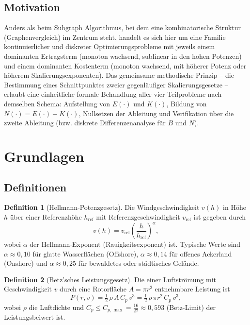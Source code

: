 ﻿\documentclass[a4paper,12pt]{article}
\theoremstyle{definition}
\newtheorem{definition}{Definition}
\begin{document}
\subsection{Motivation}

Anders als beim Subgraph Algorithmus, bei dem eine kombinatorische Struktur (Graphenvergleich) im Zentrum steht, handelt es sich hier um eine Familie kontinuierlicher und diskreter Optimierungsprobleme mit jeweils einem dominanten Ertragsterm (monoton wachsend, sublinear in den hohen Potenzen) und einem dominanten Kostenterm (monoton wachsend, mit höherer Potenz oder höherem Skalierungsexponenten). Das gemeinsame methodische Prinzip -- die Bestimmung eines Schnittpunktes zweier gegenläufiger Skalierungsgesetze -- erlaubt eine einheitliche formale Behandlung aller vier Teilprobleme nach demselben Schema: Aufstellung von $E(\cdot)$ und $K(\cdot)$, Bildung von $N(\cdot) = E(\cdot)-K(\cdot)$, Nullsetzen der Ableitung und Verifikation über die zweite Ableitung (bzw. diskrete Differenzenanalyse für $B$ und $N$).

\section{Grundlagen}

\subsection{Definitionen}

\begin{definition}[Hellmann-Potenzgesetz]
\label{def:hellmann}
Die Windgeschwindigkeit $v(h)$ in Höhe $h$ über einer Referenzhöhe $h_{\mathrm{ref}}$ mit Referenzgeschwindigkeit $v_{\mathrm{ref}}$ ist gegeben durch
\[
v(h) = v_{\mathrm{ref}} \left(\frac{h}{h_{\mathrm{ref}}}\right)^{\alpha},
\]
wobei $\alpha$ der Hellmann-Exponent (Rauigkeitsexponent) ist. Typische Werte sind $\alpha \approx 0{,}10$ für glatte Wasserflächen (Offshore), $\alpha \approx 0{,}14$ für offenes Ackerland (Onshore) und $\alpha \approx 0{,}25$ für bewaldetes oder städtisches Gelände.
\end{definition}

\begin{definition}[Betz'sches Leistungsgesetz]
\label{def:betz}
Die einer Luftströmung mit Geschwindigkeit $v$ durch eine Rotorfläche $A = \pi r^2$ entnehmbare Leistung ist
\[
P(r, v) = \tfrac{1}{2}\,\rho\, A\, C_p\, v^3 = \tfrac{1}{2}\,\rho\, \pi r^2\, C_p\, v^3,
\]
wobei $\rho$ die Luftdichte und $C_p \le C_{p,\max} = \tfrac{16}{27} \approx 0{,}593$ (Betz-Limit) der Leistungsbeiwert ist.
\end{definition}
\end{document}
